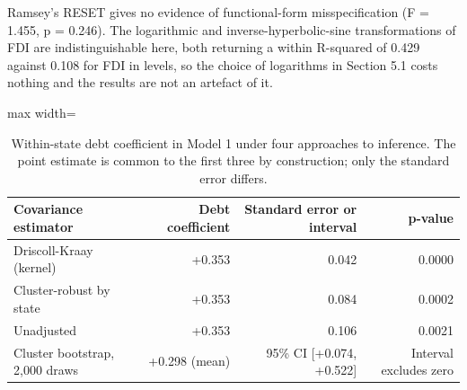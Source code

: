 \documentclass[12pt,a4paper]{article}
\begin{document}
Ramsey's RESET gives no evidence of functional-form misspecification (F = 1.455, p = 0.246). The logarithmic and inverse-hyperbolic-sine transformations of FDI are indistinguishable here, both returning a within R-squared of 0.429 against 0.108 for FDI in levels, so the choice of logarithms in Section 5.1 costs nothing and the results are not an artefact of it.

\begin{table}[H]
\centering
\caption{Within-state debt coefficient in Model 1 under four approaches to inference. The point estimate is common to the first three by construction; only the standard error differs.}
\label{tab:33}
\footnotesize
\begin{adjustbox}{max width=\textwidth}
\begin{tabular}{@{}lrrr@{}}
\toprule
Covariance estimator & Debt coefficient & Standard error or interval & p-value \\
\midrule
Driscoll-Kraay (kernel) & +0.353 & 0.042 & 0.0000 \\
Cluster-robust by state & +0.353 & 0.084 & 0.0002 \\
Unadjusted & +0.353 & 0.106 & 0.0021 \\
Cluster bootstrap, 2,000 draws & +0.298 (mean) & 95\% CI [+0.074, +0.522] & Interval excludes zero \\
\bottomrule
\end{tabular}
\end{adjustbox}
\end{table}
\end{document}
